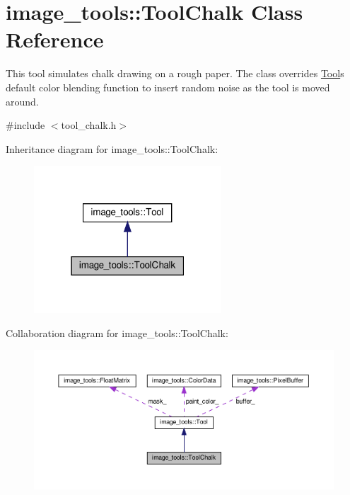 \hypertarget{classimage__tools_1_1ToolChalk}{}\section{image\+\_\+tools\+:\+:Tool\+Chalk Class Reference}
\label{classimage__tools_1_1ToolChalk}


This tool simulates chalk drawing on a rough paper. The class overrides \hyperlink{classimage__tools_1_1Tool}{Tool}\textquotesingle{}s default color blending function to insert random noise as the tool is moved around.  




{\ttfamily \#include $<$tool\+\_\+chalk.\+h$>$}



Inheritance diagram for image\+\_\+tools\+:\+:Tool\+Chalk\+:
\nopagebreak
\begin{figure}[H]
\begin{center}
\leavevmode
\includegraphics[width=199pt]{classimage__tools_1_1ToolChalk__inherit__graph}
\end{center}
\end{figure}


Collaboration diagram for image\+\_\+tools\+:\+:Tool\+Chalk\+:
\nopagebreak
\begin{figure}[H]
\begin{center}
\leavevmode
\includegraphics[width=350pt]{classimage__tools_1_1ToolChalk__coll__graph}
\end{center}
\end{figure}
